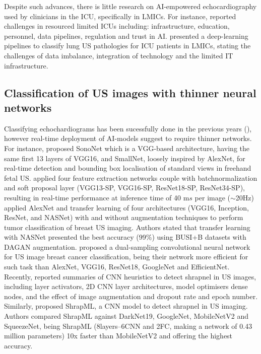 \documentclass[mlabstract,twocolumn]{jmlr}
\begin{document}
Despite such advances, there is little research on AI-empowered echocardiography used by clinicians in the ICU, specifically in LMICs.
For instance, \cite{2021-huyNhat-vanHao-in-FAIR-MICCAI} reported challenges in resourced limited ICUs including: infrastructure, education, personnel, data pipelines, regulation and trust in AI.
\cite{2021-kerdegari-Applied-Sciences-MDPI, 2021-kerdegari-ISBI-IEEE, 2021-huyNhat-kerdegari-in-FAIR-MICCAI} presented a deep-learning pipelines to classify lung US pathologies for ICU patients in LMICs, stating the challenges of data imbalance, integration of technology and the limited IT infrastructure.

\subsection{Classification of US images with thinner neural networks} \label{subsec:thinnerNets}
Classifying echochardiograms has been sucessfully done in the previous years (), however real-time deployment of AI-models suggest to require thinner networks.
For instance, \citet{baumgartner2017-IEEETransMedImag} proposed SonoNet which is a VGG-based architecture, having the same first 13 layers of VGG16, and SmallNet, loosely inspired by AlexNet, for real-time detection and bounding box localisation of standard views in freehand fetal US.
\citet{toussaint2018-MICCAI} applied four feature extraction networks couple with batchnormalization and soft proposal layer (VGG13-SP, VGG16-SP, ResNet18-SP, ResNet34-SP), resulting in real-time performance at inference time of 40 m$s$ per image ($\sim$20Hz)
\citet{Al-Dhabyani2019-IJACSA} applied AlexNet and transfer learning of four architectures (VGG16, Inception, ResNet, and NASNet) with and without augmentation techniques to perform tumor classification of breast US imaging.
Authors stated that transfer learning with NASNet presented the best accuracy (99\%) using BUSI+B datasets with DAGAN augmentation.
\citet{xie2020-physics-in-medicine-biology} proposed a dual-sampling convolutional neural network for US image breast cancer classification, being their network more efficient for such task than AlexNet, VGG16, ResNet18, GoogleNet and EfficientNet.
Recently, \citet{snider2022-ScientificReports} reported summaries of CNN heuristics to detect shrapnel in US images, including layer activators, 2D CNN layer architectures, model optimisers dense nodes, and the effect of image augmentation and dropout rate and epoch number.
Similarly, \citet{boice2022-in-jimaging} proposed ShrapML, a CNN model to detect shrapnel in US imaging.
Authors compared ShrapML against DarkNet19, GoogleNet, MobileNetV2 and SqueezeNet, being ShrapML (8layers--6CNN and 2FC, making a network of 0.43 million parameters) 10x faster than MobileNetV2 and offering the highest accuracy.
\end{document}

